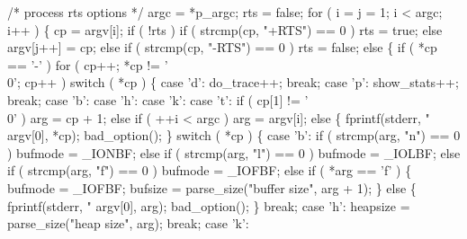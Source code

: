     /* process rts options */
    argc = *p_argc;
    rts  = false;
    for ( i = j = 1; i < argc; i++ )
    \{
        cp = argv[i];
        if ( !rts )
            if ( strcmp(cp, "+RTS") == 0 )
                rts = true;
            else
                argv[j++] = cp;
        else if ( strcmp(cp, "-RTS") == 0 )
            rts = false;
        else
        \{
            if ( *cp == '-' )
                for ( cp++; *cp != '\\0'; cp++ )
                    switch ( *cp )
                    \{
                    case 'd':
                        do_trace++;
                        break;
                    case 'p':
                        show_stats++;
                        break;
                    case 'b':
                    case 'h':
                    case 'k':
                    case 't':
                        if ( cp[1] != '\\0' )
                            arg = cp + 1;
                        else if ( ++i < argc )
                            arg = argv[i];
                        else
                        \{
                            fprintf(stderr, "%
                                    argv[0], *cp);
                            bad_option();
                        \}
                        switch ( *cp )
                        \{
                        case 'b':
                            if ( strcmp(arg, "n") == 0 )
                                bufmode = _IONBF;
                            else if ( strcmp(arg, "l") == 0 )
                                bufmode = _IOLBF;
                            else if ( strcmp(arg, "f") == 0 )
                                bufmode = _IOFBF;
                            else if ( *arg == 'f' )
                            \{
                                bufmode = _IOFBF;
                                bufsize = parse_size("buffer size", arg + 1);
                            \}
                            else
                            \{
                                fprintf(stderr,
                                        "%
                                        argv[0], arg);
                                bad_option();
                            \}
                            break;
                        case 'h':
                            heapsize = parse_size("heap size", arg);
                            break;
                        case 'k':
